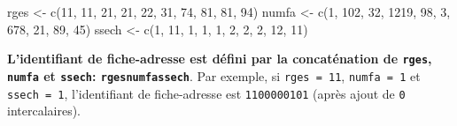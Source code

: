 \documentclass[12pt,twosided, notitlepage]{book}
\newenvironment{Shaded}{}{}
\newcommand{\DecValTok}[1]{#1}
\newcommand{\KeywordTok}[1]{\textcolor[rgb]{0.00,0.00,1.00}{#1}}
\newcommand{\NormalTok}[1]{#1}
\newcommand{\StringTok}[1]{\textcolor[rgb]{0.00,0.50,0.50}{#1}}
\renewenvironment{Shaded}{\begin{snugshade}}{\end{snugshade}}
\begin{document}
\begin{Shaded}
\begin{Highlighting}[]
\NormalTok{rges <-}\StringTok{ }\KeywordTok{c}\NormalTok{(}\DecValTok{11}\NormalTok{, }\DecValTok{11}\NormalTok{, }\DecValTok{21}\NormalTok{, }\DecValTok{21}\NormalTok{, }\DecValTok{22}\NormalTok{, }\DecValTok{31}\NormalTok{, }\DecValTok{74}\NormalTok{, }\DecValTok{81}\NormalTok{, }\DecValTok{81}\NormalTok{, }\DecValTok{94}\NormalTok{)}
\NormalTok{numfa <-}\StringTok{ }\KeywordTok{c}\NormalTok{(}\DecValTok{1}\NormalTok{, }\DecValTok{102}\NormalTok{, }\DecValTok{32}\NormalTok{, }\DecValTok{1219}\NormalTok{, }\DecValTok{98}\NormalTok{, }\DecValTok{3}\NormalTok{, }\DecValTok{678}\NormalTok{, }\DecValTok{21}\NormalTok{, }\DecValTok{89}\NormalTok{, }\DecValTok{45}\NormalTok{)}
\NormalTok{ssech <-}\StringTok{ }\KeywordTok{c}\NormalTok{(}\DecValTok{1}\NormalTok{, }\DecValTok{11}\NormalTok{, }\DecValTok{1}\NormalTok{, }\DecValTok{1}\NormalTok{, }\DecValTok{1}\NormalTok{, }\DecValTok{2}\NormalTok{, }\DecValTok{2}\NormalTok{, }\DecValTok{2}\NormalTok{, }\DecValTok{12}\NormalTok{, }\DecValTok{11}\NormalTok{)}
\end{Highlighting}
\end{Shaded}

\textbf{L'identifiant de fiche-adresse est défini par la concaténation
de \texttt{rges}, \texttt{numfa} et \texttt{ssech}:
\texttt{rges\textbar{}\textbar{}numfa\textbar{}\textbar{}ssech}}. Par
exemple, si \texttt{rges\ =\ 11}, \texttt{numfa\ =\ 1} et
\texttt{ssech\ =\ 1}, l'identifiant de fiche-adresse est
\texttt{1100000101} (après ajout de \texttt{0} intercalaires).
\end{document}
